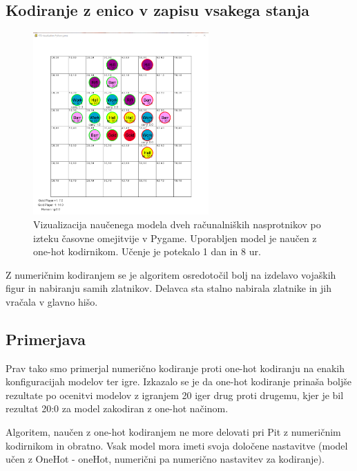 \documentclass[a4paper, 12pt]{book}
\begin{document}
\subsection{Kodiranje z enico v zapisu vsakega stanja}

\begin{figure}[h]
	\begin{center}
		\includegraphics[width=0.6\textwidth]{photos/first-onehot.pdf}
	\end{center}
	\caption{Vizualizacija naučenega modela dveh računalniških nasprotnikov po izteku časovne omejitvije v Pygame. 
		Uporabljen model je naučen z one-hot kodirnikom. Učenje je potekalo 1 dan in 8 ur.}
	\label{vizualizacijaRezultatovOneHotKodirnik100Timeout}
\end{figure}

Z numeričnim kodiranjem se je algoritem osredotočil bolj na izdelavo vojaških figur in nabiranju samih zlatnikov.
Delavca sta stalno nabirala zlatnike in jih vračala v glavno hišo.

\subsection{Primerjava}

Prav tako smo primerjal numerično kodiranje proti one-hot kodiranju na enakih konfiguracijah modelov ter igre.
Izkazalo se je da one-hot kodiranje prinaša boljše rezultate po ocenitvi modelov z igranjem 20 iger drug proti drugemu, kjer je bil rezultat 20:0 za model zakodiran z one-hot načinom.


Algoritem, naučen z one-hot kodiranjem ne more delovati pri Pit z numeričnim kodirnikom in obratno. 
Vsak model mora imeti svoja določene nastavitve (model učen z OneHot - oneHot, numerični pa numerično nastavitev za kodiranje).
\end{document}
